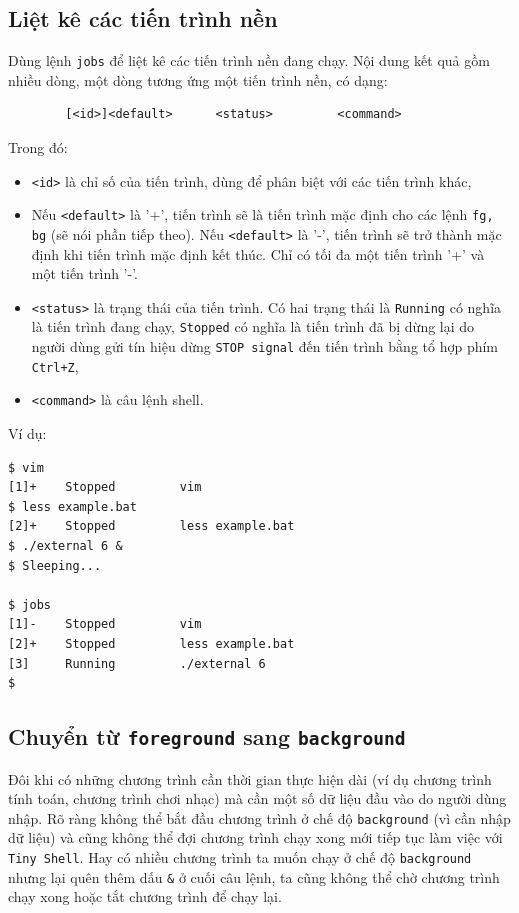 \documentclass[a4paper,12pt]{report}
\begin{document}
        \subsection{Liệt kê các tiến trình nền}
	    Dùng lệnh \texttt{jobs} để liệt kê các tiến trình nền đang chạy.
	    Nội dung kết quả gồm nhiều dòng, một dòng tương ứng một tiến trình
	    nền, có dạng:
	    \begin{verbatim}
	    [<id>]<default>      <status>         <command>
	    \end{verbatim}
	    Trong đó:
	    \begin{itemize}
	        \item \texttt{<id>} là chỉ số của tiến trình, dùng để phân biệt
	            với các tiến trình khác,
	        \item Nếu \texttt{<default>} là '+', tiến trình sẽ là tiến
	            trình mặc định cho các lệnh \texttt{fg, bg} (sẽ nói phần
	            tiếp theo). Nếu \texttt{<default>} là '-', tiến trình sẽ
	            trở thành mặc định khi tiến trình mặc định kết thúc. Chỉ có
	            tối đa một tiến trình '+' và một tiến trình '-'.
	        \item \texttt{<status>} là trạng thái của tiến trình. Có hai
	            trạng thái là
	            \texttt{Running} có nghĩa là tiến trình đang chạy,
	            \texttt{Stopped} có nghĩa là tiến trình đã bị dừng lại do
	            người dùng gửi tín hiệu dừng \texttt{STOP signal} đến tiến
	            trình bằng tổ hợp phím \texttt{Ctrl+Z},
	        \item \texttt{<command>} là câu lệnh shell.
	    \end{itemize}
	
	    Ví dụ:
	    \begin{verbatim}
$ vim
[1]+    Stopped         vim
$ less example.bat
[2]+    Stopped         less example.bat
$ ./external 6 &
$ Sleeping...

$ jobs
[1]-    Stopped         vim
[2]+    Stopped         less example.bat
[3]     Running         ./external 6 
$
	    \end{verbatim}
	
        \subsection{Chuyển từ \texttt{foreground} sang
	    \texttt{background}}
	    Đôi khi có những chương trình cần thời gian thực hiện dài (ví
	    dụ chương trình tính toán, chương trình chơi nhạc) mà cần một
	    số dữ liệu đầu vào do người dùng nhập. Rõ ràng không thể bắt
	    đầu chương trình ở chế độ \texttt{background} (vì cần nhập dữ
	    liệu) và cũng không thể đợi chương trình chạy xong mới tiếp tục
	    làm việc với \texttt{Tiny Shell}. Hay có nhiều chương trình ta
	    muốn chạy ở chế độ \texttt{background} nhưng lại quên thêm dấu
	    \texttt{\&} ở cuối câu lệnh, ta cũng không thể chờ chương trình
	    chạy xong hoặc tắt chương trình để chạy lại.\\
	
\end{document}
